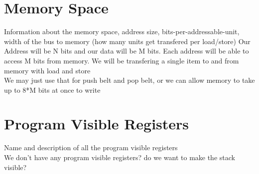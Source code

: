 \documentclass{article}
\begin{document}
\section{Memory Space}
Information about the memory space, address size, bits-per-addressable-unit, width of the bus to memory (how many units get transfered per load/store)
Our Address will be N bits and our data will be M bits.
Each address will be able to access M bits from memory.
We will be transfering a single item to and from memory with load and store\\
We may just use that for push belt and pop belt, or we can allow memory to take up to 8*M bits at once to write

\section{Program Visible Registers}
Name and description of all the program visible registers\\
We don't have any program visible registers? do we want to make the stack visible? 
\end{document}
